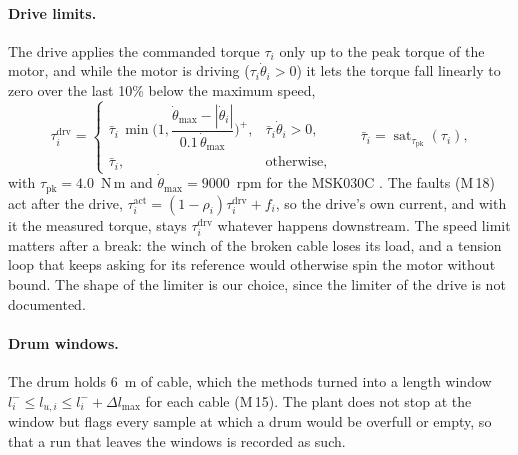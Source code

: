 \documentclass[10pt]{article}
\begin{document}
\paragraph{Drive limits.} The drive applies the commanded torque $\tau_i$ only up to the peak torque of the motor, and while the motor is driving ($\tau_i\dot\theta_i>0$) it lets the torque fall linearly to zero over the last 10\% below the maximum speed,
\begin{equation}\label{eq:drive}
\tau_i^{\mathrm{drv}}=\begin{cases}\bar\tau_i\,\min\!\Big(1,\dfrac{\dot\theta_{\max}-|\dot\theta_i|}{0.1\,\dot\theta_{\max}}\Big)^{+}, & \bar\tau_i\dot\theta_i>0,\\[4pt] \bar\tau_i, & \text{otherwise,}\end{cases}
\qquad \bar\tau_i=\operatorname{sat}_{\tau_{\mathrm{pk}}}(\tau_i),
\end{equation}
with $\tau_{\mathrm{pk}}=4.0$~N\,m and $\dot\theta_{\max}=9000$~rpm for the MSK030C \citep{rexroth_msk2018}. The faults (M\,18) act after the drive, $\tau_i^{\mathrm{act}}=(1-\rho_i)\tau_i^{\mathrm{drv}}+f_i$, so the drive's own current, and with it the measured torque, stays $\tau_i^{\mathrm{drv}}$ whatever happens downstream. The speed limit matters after a break: the winch of the broken cable loses its load, and a tension loop that keeps asking for its reference would otherwise spin the motor without bound. The shape of the limiter is our choice, since the limiter of the drive is not documented.

\paragraph{Drum windows.} The drum holds 6~m of cable, which the methods turned into a length window $l_i^-\le l_{u,i}\le l_i^-+\Delta l_{\max}$ for each cable (M\,15). The plant does not stop at the window but flags every sample at which a drum would be overfull or empty, so that a run that leaves the windows is recorded as such.
\end{document}
